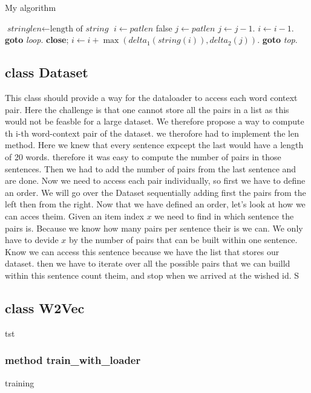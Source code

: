  \begin{algorithm}
\caption{My algorithm}\label{euclid}
\begin{algorithmic}[1]
\State $\textit{stringlen} \gets \text{length of }\textit{string}$
\State $i \gets \textit{patlen}$
 \Return false
\EndIf
\State $j \gets \textit{patlen}$
\State $j \gets j-1$.
\State $i \gets i-1$.
\State \textbf{goto} \emph{loop}.
\State \textbf{close};
\EndIf
\State $i \gets i+\max(\textit{delta}_1(\textit{string}(i)),\textit{delta}_2(j))$.
\State \textbf{goto} \emph{top}.
\EndProcedure
\end{algorithmic}
\end{algorithm}
\subsection{class Dataset}
This class should provide a way for the dataloader to access each word context pair. Here the challenge is that one cannot store all the pairs in a list as this would not be feasble for a large dataset. We therefore propose a way to compute th i-th word-context pair of the dataset. we therofore had to implement the len method. Here we knew that every sentence expcept the last would have a length of 20 words. therefore it was easy to compute the number of pairs in those sentences. Then we had to add the number of pairs from the last sentence and are done. 
Now we need to access each pair individually, so first we have to define an order. We will go over the Dataset sequentially adding first the pairs from the left then from the right. Now that we have defined an order, let's look at how we can acces theim. Given an item index $x$ we need to find in which sentence the pairs is. Because we know how many pairs per sentence their is we can. We only have to devide $x$ by the number of pairs that can be built within one sentence. Know we can access this sentence because we have the list that stores our dataset. then we have to iterate over all the possible pairs that we can builld within this sentence count theim, and stop when we arrived at the wished id. S

\subsection{class W2Vec}
tst
\subsubsection{method train\_with\_loader}
training

